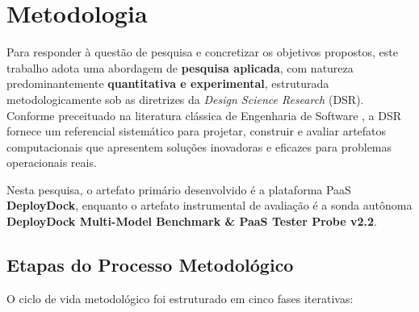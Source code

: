 
\section{Metodologia}
\label{sec:metodologia}

Para responder à questão de pesquisa e concretizar os objetivos propostos, este trabalho adota uma abordagem de \textbf{pesquisa aplicada}, com natureza predominantemente \textbf{quantitativa e experimental}, estruturada metodologicamente sob as diretrizes da \textit{Design Science Research} (DSR). Conforme preceituado na literatura clássica de Engenharia de Software \cite{pressman2014,sommerville2011}, a DSR fornece um referencial sistemático para projetar, construir e avaliar artefatos computacionais que apresentem soluções inovadoras e eficazes para problemas operacionais reais.

Nesta pesquisa, o artefato primário desenvolvido é a plataforma PaaS \textbf{DeployDock}, enquanto o artefato instrumental de avaliação é a sonda autônoma \textbf{DeployDock Multi-Model Benchmark \& PaaS Tester Probe v2.2}.

\subsection{Etapas do Processo Metodológico}
\label{sec:etapas-metodologia}

O ciclo de vida metodológico foi estruturado em cinco fases iterativas:

